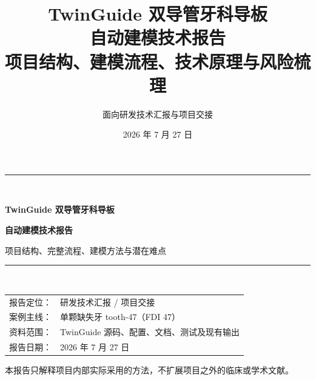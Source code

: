 \documentclass[UTF8,12pt,a4paper,openany,fontset=none]{ctexrep}
\title{\Huge\bfseries TwinGuide 双导管牙科导板\\[0.35em]
自动建模技术报告\\[0.9em]
\Large 项目结构、建模流程、技术原理与风险梳理}
\author{面向研发技术汇报与项目交接}
\date{2026 年 7 月 27 日}
\begin{document}
\begin{titlepage}
  \centering
  \vspace*{2.6cm}
  {\color{TGBlue}\rule{\textwidth}{1.2pt}}\\[1.1cm]
  {\Huge\bfseries TwinGuide 双导管牙科导板\par}
  \vspace{0.4cm}
  {\Huge\bfseries 自动建模技术报告\par}
  \vspace{0.8cm}
  {\Large 项目结构、完整流程、建模方法与潜在难点\par}
  \vspace{1.0cm}
  {\color{TGBlue}\rule{\textwidth}{1.2pt}}\\[1.6cm]
  \begin{tabular}{rl}
    报告定位：& 研发技术汇报 / 项目交接\\
    案例主线：& 单颗缺失牙 tooth-47（FDI 47）\\
    资料范围：& TwinGuide 源码、配置、文档、测试及现有输出\\
    报告日期：& 2026 年 7 月 27 日
  \end{tabular}
  \vfill
  {\small 本报告只解释项目内部实际采用的方法，不扩展项目之外的临床或学术文献。\par}
\end{titlepage}


\tableofcontents
\clearpage
\listoffigures
\clearpage
\listoftables
\clearpage









\appendix


\end{document}
